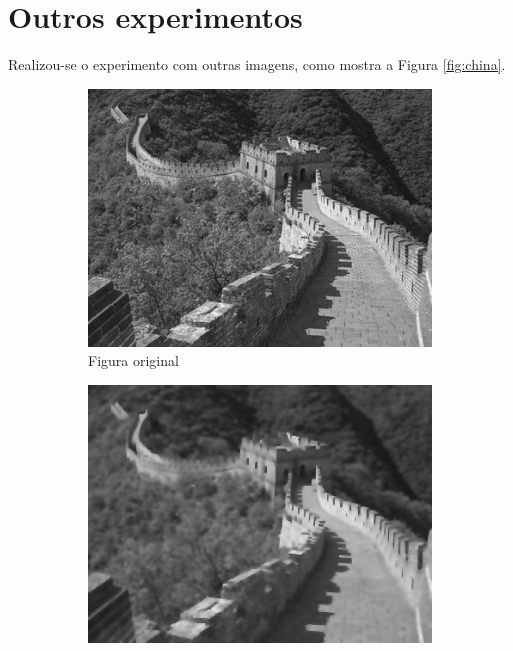 \documentclass[10pt,a4paper]{article}
\begin{document}
\section{Outros experimentos}
Realizou-se o experimento com outras imagens, como mostra a Figura \ref{fig:china}.
\begin{figure}[!ht]
    \centering
    \begin{subfigure}[ht]{0.4\textwidth}
        \includegraphics[width=\textwidth]{china_src.jpg}
        \caption{Figura original}
        \label{fig:china_src}
    \end{subfigure}
    \qquad
    \begin{subfigure}[ht]{0.4\textwidth}
        \includegraphics[width=\textwidth]{china_aniso.jpg}

\end{subfigure}
\end{figure}
\end{document}
